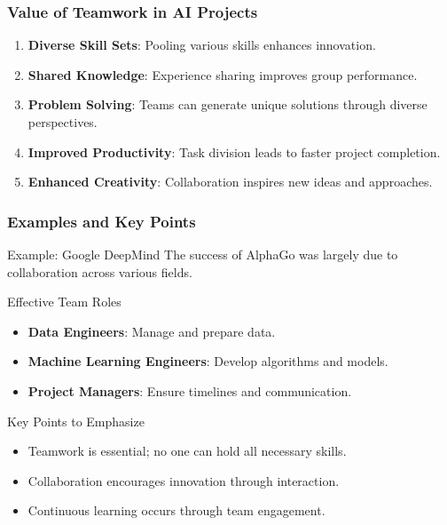 \documentclass[aspectratio=169]{beamer}
\begin{document}
\begin{frame}[fragile]
    \frametitle{Value of Teamwork in AI Projects}
    \begin{enumerate}
        \item \textbf{Diverse Skill Sets}: Pooling various skills enhances innovation.
        \item \textbf{Shared Knowledge}: Experience sharing improves group performance.
        \item \textbf{Problem Solving}: Teams can generate unique solutions through diverse perspectives.
        \item \textbf{Improved Productivity}: Task division leads to faster project completion.
        \item \textbf{Enhanced Creativity}: Collaboration inspires new ideas and approaches.
    \end{enumerate}
\end{frame}

\begin{frame}[fragile]
    \frametitle{Examples and Key Points}
    \begin{block}{Example: Google DeepMind}
        The success of AlphaGo was largely due to collaboration across various fields.
    \end{block}
    
    \begin{block}{Effective Team Roles}
        \begin{itemize}
            \item \textbf{Data Engineers}: Manage and prepare data.
            \item \textbf{Machine Learning Engineers}: Develop algorithms and models.
            \item \textbf{Project Managers}: Ensure timelines and communication.
        \end{itemize}
    \end{block}

    \begin{block}{Key Points to Emphasize}
        \begin{itemize}
            \item Teamwork is essential; no one can hold all necessary skills.
            \item Collaboration encourages innovation through interaction.
            \item Continuous learning occurs through team engagement.
        \end{itemize}
    \end{block}
\end{frame}
\end{document}

